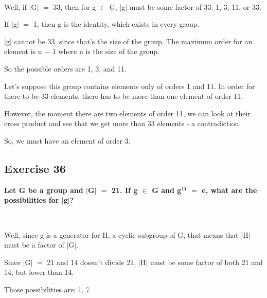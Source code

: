 \documentclass{article}
\newcommand{\mt}[1]{\ensuremath{#1}}
\newcommand\ssc[2][\DefaultOpt]{%
  \def\DefaultOpt{#2}%
  \subsection[#1]{#2}%
}
\newcommand{\mem}{\mt{\in} }
\newcommand{\av}[1]{\mt{|}#1\mt{|}}  %
\newcommand{\ms}{\mt{-} }
\newcommand{\eql}{\mt{=} }
\newcommand{\uf}[2]{#1\mt{^{#2}}}
\begin{document}
{{\

Well, if \av{G} \eql 33, then for g \mem G, \av{g} must be some factor of 33: 1, 3, 11, or 33.

If \av{g} \eql 1, then g is the identity, which exists in every group.

\av{g} cannot be 33, since that's the size of the group. The maximum order for an element is n \ms 1 where n is the size of the group.

So the possible orders are 1, 3, and 11.

Let's suppose this group contains elements only of orders 1 and 11. In order for there to be 33 elements, there has to be more than one element of order 11.

However, the moment there are two elements of order 11, we can look at their cross product and see that we get more than 33 elements - a contradiction.

So, we must have an element of order 3.

}
\ssc{Exercise 36}{
\textbf{Let G be a group and \av{G} \eql 21. If g \mem G and \uf{g}{14} \eql e, what are the possibilities for \av{g}?}

\

Well, since g is a generator for H, a cyclic subgroup of G, that means that \av{H} must be a factor of \av{G}.

Since \av{G} \eql 21 and 14 doesn't divide 21, \av{H} must be some factor of both 21 and 14, but lower than 14.

Those possibilities are: 1, 7 
}
}
\end{document}
